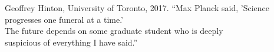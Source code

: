 \begin{prequote}[20pt]{Geoffrey Hinton, University of Toronto, 2017.}
    ``Max Planck said, 'Science progresses one funeral at a time.'\\
    The future depends on some graduate student who is deeply\\
    suspicious of everything I have said.''\\

\end{prequote}